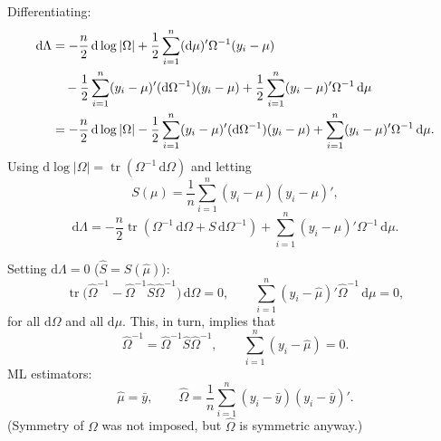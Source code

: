 \documentclass[14pt]{extarticle}
\theoremstyle{plain}
\theoremstyle{definition}
\theoremstyle{remark}
\DeclareMathOperator{\tr}{tr}
\newcommand{\dd}{\mathrm{d}}
\begin{document}
Differentiating:
\begin{align}\label{eq:44_step1}
\dd\Lambda &= -\frac{n}{2}\, \dd\log|\Omega| + \frac{1}{2}\sum_{i=1}^{n}(\dd\mu)'\Omega^{-1}(y_i - \mu) \notag \\
&\quad - \frac{1}{2}\sum_{i=1}^{n}(y_i - \mu)'(\dd\Omega^{-1})(y_i - \mu) + \frac{1}{2}\sum_{i=1}^{n}(y_i - \mu)'\Omega^{-1}\, \dd\mu \notag \\
&= -\frac{n}{2}\, \dd\log|\Omega| - \frac{1}{2}\sum_{i=1}^{n}(y_i - \mu)'(\dd\Omega^{-1})(y_i - \mu) + \sum_{i=1}^{n}(y_i - \mu)'\Omega^{-1}\, \dd\mu.
\end{align}
Using $\dd\log|\Omega| = \tr(\Omega^{-1}\,\dd\Omega)$ and letting
\[
S(\mu) = \frac{1}{n}\sum_{i=1}^{n}(y_i - \mu)(y_i - \mu)',
\]
\begin{equation}\label{eq:44_step2}
\dd\Lambda = -\frac{n}{2}\tr(\Omega^{-1}\, \dd\Omega + S\, \dd\Omega^{-1}) + \sum_{i=1}^{n}(y_i - \mu)'\Omega^{-1}\, \dd\mu.
\end{equation}

Setting $\dd\Lambda = 0$ ($\hat S = S(\hat\mu)$):
\[
\tr\bigl(\hat{\Omega}^{-1} - \hat{\Omega}^{-1}\hat{S}\hat{\Omega}^{-1}\bigr)\, \dd\Omega = 0, \qquad
\sum_{i=1}^{n}(y_i - \hat{\mu})'\hat{\Omega}^{-1}\, \dd\mu = 0,
\]
for all $\dd\Omega$ and all $\dd\mu$. This, in turn, implies that
\[
\hat{\Omega}^{-1} = \hat{\Omega}^{-1}\hat{S}\hat{\Omega}^{-1}, \qquad
\sum_{i=1}^{n}(y_i - \hat{\mu}) = 0.
\]
ML estimators:
\begin{equation}\label{eq:45}
\hat{\mu} = \bar{y}, \qquad
\hat{\Omega} = \frac{1}{n}\sum_{i=1}^{n}(y_i - \bar{y})(y_i - \bar{y})'.
\end{equation}
(Symmetry of $\Omega$ was not imposed, but $\hat\Omega$ is symmetric anyway.)
\end{document}
